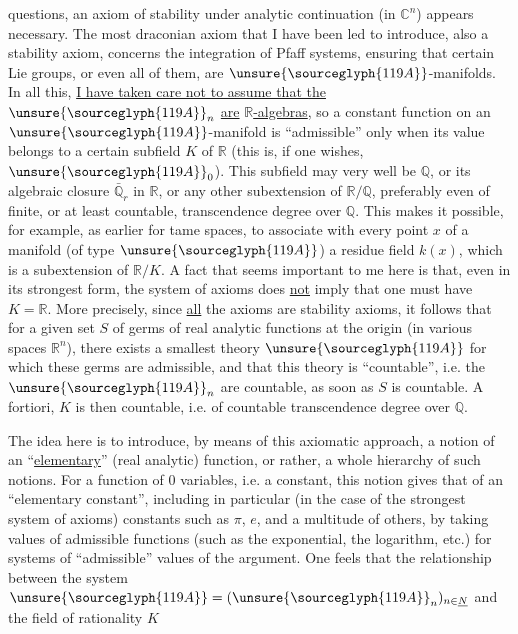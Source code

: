 
questions, an axiom of stability under analytic continuation
(in $\mathbb{C}^{n}$) appears necessary. The most draconian axiom that
I have been led to introduce, also a stability axiom,
concerns the integration of Pfaff systems, ensuring that certain
Lie groups, or even all of them, are $\unsure{\sourceglyph{119A}}$-manifolds. In all
this, \uline{I have taken care not to assume that the} $\unsure{\sourceglyph{119A}}_{n}$ \uline{are}
\uline{$\mathbb{R}$-algebras}, so a constant function on an $\unsure{\sourceglyph{119A}}$-manifold is
``admissible'' only when its value belongs to a certain subfield
$K$ of $\mathbb{R}$ (this is, if one wishes, $\unsure{\sourceglyph{119A}}_{0}$). This subfield may very well
be $\mathbb{Q}$, or its algebraic closure $\bar{\mathbb{Q}}_{r}$ in $\mathbb{R}$, or any other
subextension of $\mathbb{R}/\mathbb{Q}$, preferably even of finite,
or at least countable, transcendence degree over $\mathbb{Q}$. This makes it possible,
for example, as earlier for tame spaces, to associate
with every point $x$ of a manifold (of type $\unsure{\sourceglyph{119A}}$) a residue
field $k(x)$, which is a subextension of $\mathbb{R}/K$. A fact that
seems important to me here is that, even in its strongest form,
the system of axioms does \uline{not} imply that one must have $K = \mathbb{R}$. More
precisely, since \uline{all} the axioms are stability
axioms, it follows that for a given set $S$ of germs
of real analytic functions at the origin (in various spaces
$\mathbb{R}^{n}$), there exists a smallest theory $\unsure{\sourceglyph{119A}}$ for which these germs
are admissible, and that this theory is ``countable'', i.e. the $\unsure{\sourceglyph{119A}}_{n}$
are countable, as soon as $S$ is countable. A fortiori, $K$ is then
countable, i.e. of countable transcendence degree over $\mathbb{Q}$.

The idea here is to introduce, by means of this
axiomatic approach, a notion of an ``\uline{elementary}'' (real analytic) function,
or rather, a whole hierarchy of such notions. For a function
of 0 variables, i.e. a constant, this notion gives that
of an ``elementary constant'', including in particular (in the case of
the strongest system of axioms) constants such as $\pi$, $e$, and
a multitude of others, by taking values of admissible functions
(such as the exponential, the logarithm, etc.) for systems
of ``admissible'' values of the argument. One feels that the relationship
between the system $\unsure{\sourceglyph{119A}} = (\unsure{\sourceglyph{119A}}_{n})_{n\in\underline{N}}$ and the field of rationality $K$

